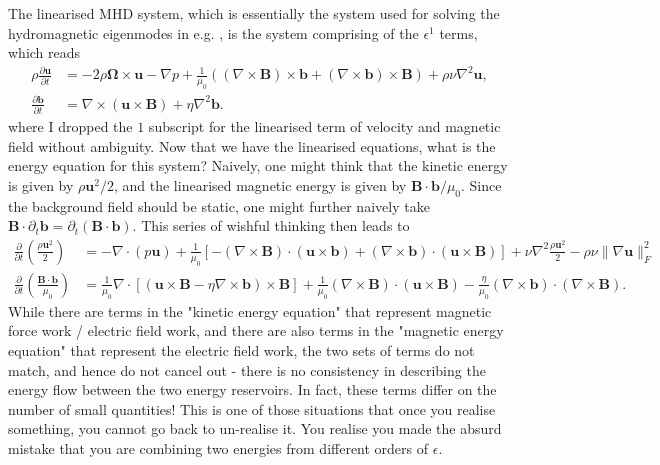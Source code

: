 %
The linearised MHD system, which is essentially the system used for solving the hydromagnetic eigenmodes in e.g. \citet{luo_waves_2022,luo_waves2_2022,gerick_interannual_2024}, is the system comprising of the $\epsilon^1$ terms, which reads
%
\begin{equation}\label{eqn:mhd-lin}
\begin{aligned}
    \rho \frac{\partial \mathbf{u}}{\partial t} &= - 2 \rho \boldsymbol{\Omega}\times \mathbf{u} - \nabla p + \frac{1}{\mu_0} \left((\nabla\times \mathbf{B})\times \mathbf{b} + (\nabla\times \mathbf{b})\times \mathbf{B}\right) + \rho \nu \nabla^2 \mathbf{u}, \\ 
    \frac{\partial \mathbf{b}}{\partial t} &= \nabla\times (\mathbf{u}\times \mathbf{B}) + \eta \nabla^2 \mathbf{b}.
\end{aligned}
\end{equation}
%
where I dropped the $1$ subscript for the linearised term of velocity and magnetic field without ambiguity.
Now that we have the linearised equations, what is the energy equation for this system? Naively, one might think that the kinetic energy is given by $\rho \mathbf{u}^2/2$, and the linearised magnetic energy is given by $\mathbf{B}\cdot \mathbf{b}/\mu_0$. Since the background field should be static, one might further naively take $\mathbf{B}\cdot \partial_t \mathbf{b} = \partial_t (\mathbf{B}\cdot \mathbf{b})$.
This series of wishful thinking then leads to
%
\[
\begin{aligned}
    \frac{\partial}{\partial t} \left(\frac{\rho \mathbf{u}^2}{2}\right) &= - \nabla \cdot (p\mathbf{u}) + \frac{1}{\mu_0}\left[-(\nabla\times \mathbf{B})\cdot (\mathbf{u}\times \mathbf{b}) + (\nabla\times \mathbf{b})\cdot (\mathbf{u}\times \mathbf{B})\right] + \nu \nabla^2 \frac{\rho\mathbf{u}^2}{2} - \rho \nu \|\nabla\mathbf{u}\|_F^2 \\ 
    \frac{\partial}{\partial t} \left(\frac{\mathbf{B}\cdot \mathbf{b}}{\mu_0}\right) &= \frac{1}{\mu_0}\nabla\cdot \left[(\mathbf{u}\times \mathbf{B} - \eta \nabla\times \mathbf{b})\times \mathbf{B}\right] + \frac{1}{\mu_0}(\nabla\times \mathbf{B})\cdot (\mathbf{u}\times \mathbf{B}) - \frac{\eta}{\mu_0} (\nabla\times \mathbf{b})\cdot (\nabla\times \mathbf{B}).
\end{aligned}
\]
%
While there are terms in the "kinetic energy equation" that represent magnetic force work / electric field work, and there are also terms in the "magnetic energy equation" that represent the electric field work, the two sets of terms do not match, and hence do not cancel out - there is no consistency in describing the energy flow between the two energy reservoirs. In fact, these terms differ on the number of small quantities! This is one of those situations that once you realise something, you cannot go back to un-realise it. You realise you made the absurd mistake that you are combining two energies from different orders of $\epsilon$.

